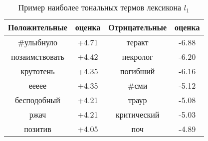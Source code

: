 \begin{table}[htp!]
\centering
\caption{Пример наиболее тональных термов лексикона $l_1$}
\label{table:rubtsova_lexicon}
\begin{tabular}{cccc}
\hline
\multicolumn{1}{c|}{Положительные}& \multicolumn{1}{c|}{оценка} & \multicolumn{1}{c|}{Отрицательные} & оценка \\ \hline
\#улыбнуло            & +4.71 & теракт   & -6.88 \\
позаимствовать        & +4.42 & некролог & -6.20 \\
крутотень             & +4.35 & погибший & -6.16 \\
еееее                 & +4.35 & \#сми    & -5.12 \\
бесподобный           & +4.21 & траур    & -5.08 \\
ржач                  & +4.21 & критический & -5.03 \\
позитив               & +4.05 & поч      & -4.89 \\ \hline
\end{tabular}
\end{table}
